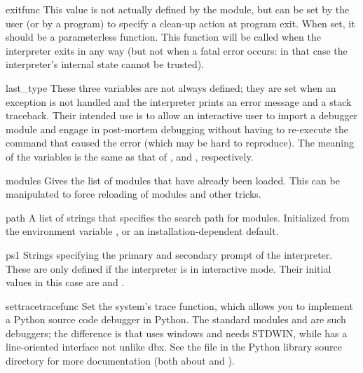 \begin{datadesc}{exitfunc}
  This value is not actually defined by the module, but can be set by
  the user (or by a program) to specify a clean-up action at program
  exit.  When set, it should be a parameterless function.  This function
  will be called when the interpreter exits in any way (but not when a
  fatal error occurs: in that case the interpreter's internal state
  cannot be trusted).
\end{datadesc}

\begin{datadesc}{last_type}
  These three variables are not always defined; they are set when an
  exception is not handled and the interpreter prints an error message
  and a stack traceback.  Their intended use is to allow an interactive
  user to import a debugger module and engage in post-mortem debugging
  without having to re-execute the command that caused the error (which
  may be hard to reproduce).  The meaning of the variables is the same
  as that of ,  and ,
  respectively.
\end{datadesc}

\begin{datadesc}{modules}
  Gives the list of modules that have already been loaded.
  This can be manipulated to force reloading of modules and other tricks.
\end{datadesc}

\begin{datadesc}{path}
  A list of strings that specifies the search path for modules.
  Initialized from the environment variable , or an
  installation-dependent default.
\end{datadesc}

\begin{datadesc}{ps1}
  Strings specifying the primary and secondary prompt of the
  interpreter.  These are only defined if the interpreter is in
  interactive mode.  Their initial values in this case are
   and .
\end{datadesc}

\begin{funcdesc}{settrace}{tracefunc}
  Set the system's trace function, which allows you to implement a
  Python source code debugger in Python.  The standard modules
   and  are such debuggers; the difference is that
   uses windows and needs STDWIN, while  has a
  line-oriented interface not unlike dbx.  See the file 
  in the Python library source directory for more documentation (both
  about  and ).
\end{funcdesc}

